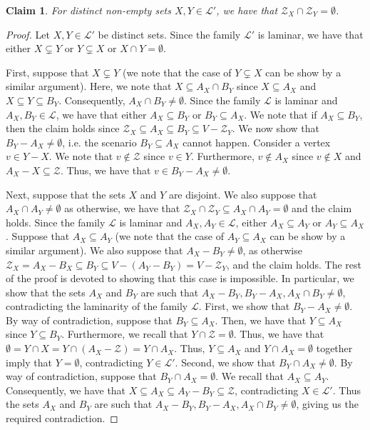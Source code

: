 \documentclass{article}
\newtheorem{claim}{Claim}[section]
\providecommand{\calL}{\mathcal{L}}
\providecommand{\calZ}{\mathcal{Z}}
\begin{document}
\begin{claim}\label{claim:Laminar-family-projection:Z_X-Z_Y-disjoint}
    For distinct non-empty sets $X, Y \in \calL'$, we have that $\calZ_{X}\cap\calZ_{Y} = \emptyset$.
\end{claim}
\begin{proof}
     Let $X, Y \in\calL'$ be distinct sets. Since the family $\calL'$ is laminar, we have that either $X \subsetneq Y$ or $Y\subsetneq X$ or $X\cap Y = \emptyset$.

    First, suppose that $X \subsetneq Y$ (we note that the case of $Y\subsetneq X$ can be show by a similar argument). Here, we note that $X \subseteq A_X \cap B_Y $ since $X \subseteq A_X$ and $X \subseteq Y \subseteq B_Y$. Consequently, $A_X\cap B_Y\neq \emptyset$. 
    Since the family $\calL$ is laminar and $A_X, B_Y \in \calL$, we have that either $A_X \subseteq B_Y$ or $B_Y \subseteq A_X$. We note that if $A_X \subseteq B_Y$, then the claim holds since $\calZ_X \subseteq A_X \subseteq B_{Y} \subseteq V - \calZ_Y$.
    We now show that $B_Y - A_X \not = \emptyset$, i.e. the scenario $B_Y \subseteq A_X$ cannot happen. 
    Consider a vertex $v \in Y - X$. We note that 
    $v \not \in \calZ$
    since $v \in Y$. Furthermore, $v \not \in A_X$ since $v \not \in X$ and $A_X - X \subseteq \calZ$.
    Thus, we have that $v \in B_Y - A_X \not = \emptyset$.

    Next, suppose that the sets $X$ and $Y$ are disjoint. We also suppose that $A_X \cap A_Y \not = \emptyset$ as otherwise, we have that $\calZ_X \cap \calZ_Y \subseteq A_X \cap A_Y = \emptyset$ and the claim holds. Since the family $\calL$ is laminar and $A_X, A_Y \in \calL$, either $A_X \subseteq A_Y$ or $A_Y \subseteq A_X$. Suppose that  $A_X \subseteq A_Y$ (we note that the case of $A_Y \subseteq A_X$ can be show by a similar argument).
    We also suppose that $A_X - B_Y \not = \emptyset$, as otherwise $\calZ_X = A_X - B_X \subseteq B_Y \subseteq V - (A_Y - B_Y) = V - \calZ_Y$, and the claim holds. 
    The rest of the proof is devoted to showing that this case is impossible. In particular, we show that
    the sets $A_X$ and $B_Y$ are such that $A_X-B_Y, B_Y-A_X, A_X\cap B_Y\neq \emptyset$, contradicting the laminarity of the family $\calL$. First, we show that $B_Y - A_X \not = \emptyset$. By way of contradiction, suppose that $B_Y \subseteq A_X$. Then, we have that $Y \subseteq A_X$ since $Y \subseteq B_Y$. Furthermore,  we recall that $Y\cap \calZ = \emptyset$. Thus, we have that $\emptyset = Y \cap X = Y \cap (A_X - \calZ) = Y\cap A_X$. Thus, $Y\subseteq A_X$ and $Y\cap A_X=\emptyset$ together imply that $Y = \emptyset$, contradicting $Y \in \calL'$. Second, we show that $B_Y\cap A_X \not = \emptyset$. By way of contradiction, suppose that $B_Y\cap A_X = \emptyset$. We recall that $A_X\subseteq A_Y$. Consequently, we have that $X \subseteq A_X \subseteq A_Y - B_Y \subseteq \calZ$, contradicting $X \in \calL'$. Thus the sets $A_X$ and $B_Y$ are such that $A_X-B_Y, B_Y-A_X, A_X\cap B_Y\neq \emptyset$, giving us the required contradiction.
\end{proof}
\end{document}

